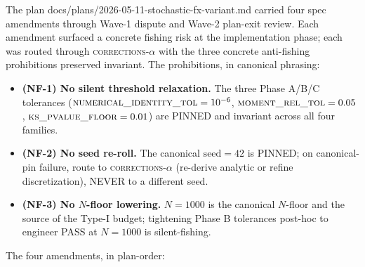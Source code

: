 \documentclass[11pt,letterpaper]{article}
\begin{document}
The plan
\textsf{docs/plans/2026-05-11-stochastic-fx-variant.md} carried four
spec amendments through Wave-1 dispute and Wave-2 plan-exit review.
Each amendment surfaced a concrete fishing risk at the implementation
phase; each was routed through \textsc{corrections-$\alpha$} with the
three concrete anti-fishing prohibitions preserved invariant. The
prohibitions, in canonical phrasing:
\begin{itemize}
    \item \textbf{(NF-1) No silent threshold relaxation.} The three
        Phase A/B/C tolerances
        ($\textsc{numerical\_identity\_tol} = 10^{-6}$,
         $\textsc{moment\_rel\_tol} = 0.05$,
         $\textsc{ks\_pvalue\_floor} = 0.01$)
        are PINNED and invariant across all four families.
    \item \textbf{(NF-2) No seed re-roll.} The canonical
        $\text{seed} = 42$ is PINNED; on canonical-pin failure, route
        to \textsc{corrections-$\alpha$} (re-derive analytic or refine
        discretization), NEVER to a different seed.
    \item \textbf{(NF-3) No $N$-floor lowering.}
        $N = 1000$ is the canonical $N$-floor and the source of the
        Type-I budget; tightening Phase B tolerances post-hoc to
        engineer PASS at $N = 1000$ is silent-fishing.
\end{itemize}

The four amendments, in plan-order:
\end{document}
